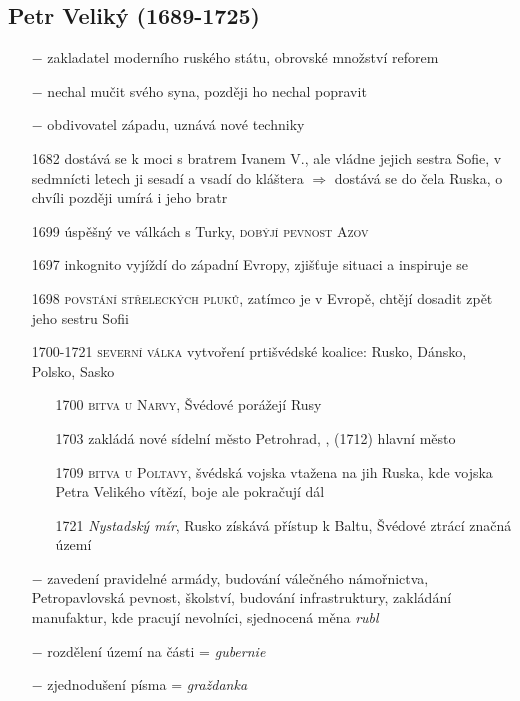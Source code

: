 \documentclass{article}
\begin{document}
\subsection*{Petr Veliký (1689-1725)}
\begin{itemize}
    \vspace{-0.5em}
    \setlength\itemsep{0.15em}
    \item[$-$] zakladatel moderního ruského státu, obrovské množství reforem
    \item[$-$] nechal mučit svého syna, později ho nechal popravit
    \item[$-$] obdivovatel západu, uznává nové techniky
    \item[1682] dostává se k moci s bratrem Ivanem V., ale vládne jejich sestra Sofie, v sedmnícti letech ji sesadí a vsadí do kláštera $\Rightarrow$ dostává se do čela Ruska, o chvíli později umírá i jeho bratr
    \item[1699] úspěšný ve válkách s Turky, \textsc{dobýjí pevnost Azov}
    \item[1697]  inkognito vyjíždí do západní Evropy, zjišťuje situaci a inspiruje se
    \item[1698] \textsc{povstání střeleckých pluků}, zatímco je v Evropě, chtějí dosadit zpět jeho sestru Sofii
    \item[1700-1721] \textsc{severní válka} vytvoření prtišvédské koalice: Rusko, Dánsko, Polsko, Sasko
    \begin{itemize}
        \vspace{-0.5em}
        \setlength\itemsep{0.15em}
        \item[1700] \textsc{bitva u Narvy}, Švédové porážejí Rusy
        \item[1703] zakládá nové sídelní město Petrohrad, , (1712) hlavní město
        \item[1709]  \textsc{bitva u Poltavy}, švédská vojska vtažena na jih Ruska, kde vojska Petra Velikého vítězí, boje ale pokračují dál
        \item[1721] \textit{Nystadský mír}, Rusko získává přístup k Baltu,  Švédové ztrácí značná území
    \end{itemize}
    \item[$-$] zavedení pravidelné armády, budování válečného námořnictva, Petropavlovská pevnost, školství, budování infrastruktury, zakládání manufaktur, kde pracují nevolníci, sjednocená měna \textit{rubl}
    \item[$-$] rozdělení území na části = \textit{gubernie}
    \item[$-$] zjednodušení písma = \textit{graždanka}
\end{itemize}
\end{document}

